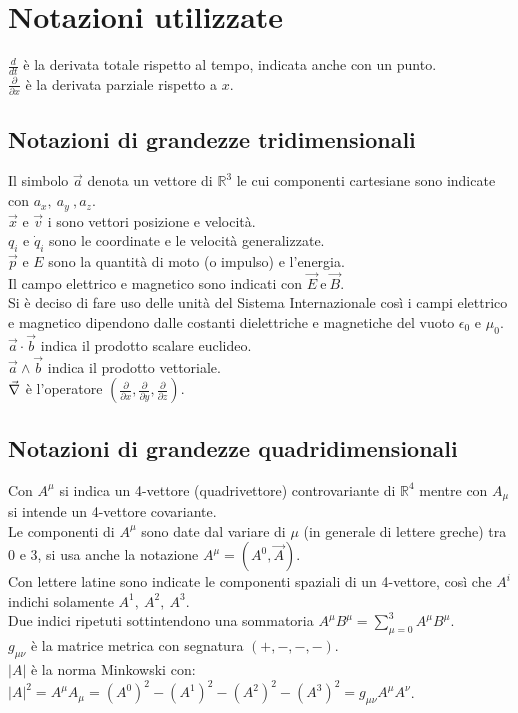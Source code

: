 \section*{Notazioni utilizzate}
\vspace*{\fill}
$\frac{d}{dt}$ è la derivata totale rispetto al tempo, indicata anche con un punto.\\

$\frac{\partial}{\partial x}$ è la derivata parziale rispetto a $x$.\\
\subsection*{Notazioni di grandezze tridimensionali}
Il simbolo $\vec{a}$ denota un vettore di $\mathbb{R}^3$ le cui componenti cartesiane sono indicate con $a_x,\ a_y\ , a_z$.\\
$\vec{x}$ e $\vec{v}$ i sono vettori posizione e velocità.\\
$q_i$ e $\dot q_i$ sono le coordinate e le velocità generalizzate. \\
$\vec{p}$ e $E$ sono la quantità di moto (o impulso) e l'energia.\\
Il campo elettrico e magnetico sono indicati con $\vec{E}\ \text{e}\ \vec{B}$.\\
Si è deciso di fare uso delle unità del Sistema Internazionale così i campi elettrico e magnetico dipendono dalle costanti dielettriche e magnetiche del vuoto $\epsilon_0$ e $\mu_0$.\\
$\vec a\cdot\vec b$ indica il prodotto scalare euclideo.\\
$\vec a\wedge\vec b$ indica il prodotto vettoriale.\\
$\vec{\nabla}$ è l'operatore $(\frac{\partial}{\partial x},\frac{\partial}{\partial y},\frac{\partial}{\partial z})$.\\
\subsection*{Notazioni di grandezze quadridimensionali}
Con $A^\mu$ si indica un 4-vettore (quadrivettore) controvariante di $\mathbb{R}^4$ mentre con $A_\mu$ si intende un 4-vettore covariante.\\
Le componenti di $A^\mu$ sono date dal variare di $\mu$ (in generale di lettere greche) tra $0$ e $3$, si usa anche la notazione $A^\mu=(A^0,\vec{A})$.\\
Con lettere latine sono indicate le componenti spaziali di un 4-vettore, così che $A^i$ indichi solamente $A^1,\ A^2,\ A^3$.\\
Due indici ripetuti sottintendono una sommatoria $A^\mu B^\mu=\sum_{\mu=0}^{3} A^\mu B^\mu$.\\
$g_{\mu \nu}$ è la matrice metrica con segnatura $(+,-,-,-)$.\\
$|A|$ è la norma Minkowski con: $|A|^2=A^\mu A_\mu=(A^0)^2-(A^1)^2-(A^2)^2-(A^3)^2=g_{\mu \nu}A^\mu A^\nu$.\\
